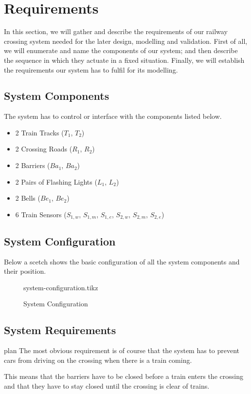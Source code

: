 \documentclass[final]{report}
\begin{document}
\chapter{Requirements}
In this section, we will gather and describe the requirements of our railway crossing system needed for the later design, modelling and validation.
First of all, we will enumerate and name the components of our system; and then describe the sequence in which they actuate in a fixed situation.
Finally, we will establish the requirements our system has to fulfil for its modelling.

\section{System Components}
The system has to control or interface with the components listed below.
\begin{itemize}
\item 2 Train Tracks ($T_{1}$, $T_{2}$)
\item 2 Crossing Roads ($R_{1}$, $R_{2}$)
\item 2 Barriers ($Ba_{1}$, $Ba_{2}$)
\item 2 Pairs of Flashing Lights ($L_{1}$, $L_{2}$)
\item 2 Bells ($Be_{1}$, $Be_{2}$)
\item 6 Train Sensors ($S_{1,w}$, $S_{1,m}$, $S_{1,e}$, $S_{2,w}$, $S_{2,m}$, $S_{2,e}$)
\end{itemize}

\section{System Configuration}
Below a scetch shows the basic configuration of all the system components and their position.
\begin{figure}[H]
	\centering
	{system-configuration.tikz}
	\caption{System Configuration}
	\label{fig:system-configuration}
\end{figure}

\section{System Requirements}\label{sec:requirements}plan
The most obvious requirement is of course that the system has to prevent cars from driving on the crossing when there is a train coming.

This means that the barriers have to be closed before a train enters the crossing and that they have to stay closed until the crossing is clear of trains.
\end{document}
